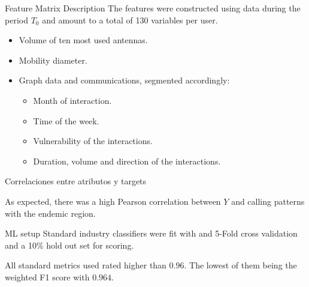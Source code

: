 \documentclass{beamer}
\begin{document}
\begin{frame}{Feature Matrix Description}
	The features were constructed using data during the period $T_0$ and amount to a total of 130 variables per user.

	\begin{itemize}
		\item Volume of ten most used antennas.
		\item Mobility diameter.
		\item Graph data and communications, segmented accordingly:
		\begin{itemize}
			\item Month of interaction.
			\item Time of the week.
			\item Vulnerability of the interactions.
			\item Duration, volume and direction of the interactions.
		\end{itemize}
	\end{itemize}

	\begin{block}{Correlaciones entre atributos y targets}

	As expected, there was a high Pearson correlation between $Y$ and calling patterns with the endemic region.
	\end{block}

\end{frame}


\begin{frame}{ ML setup}
			Standard industry classifiers were fit with
			and 5-Fold cross validation and a 10\% hold out set for scoring.

			\medskip

			All standard metrics used rated higher than $0.96$. The lowest of them being the weighted F1 score with $0.964$.

%
\end{frame}
\end{document}
